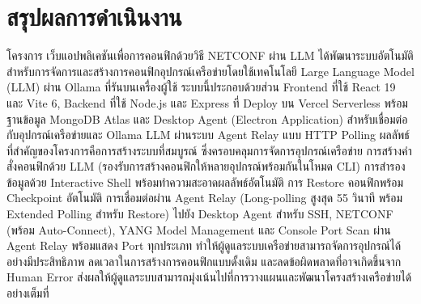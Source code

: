 ﻿%

\section{สรุปผลการดำเนินงาน}
\hspace*{1.3em}
โครงการ เว็บแอปพลิเคชันเพื่อการคอนฟิกด้วยวิธี NETCONF ผ่าน LLM ได้พัฒนาระบบอัตโนมัติสำหรับการจัดการและสร้างการคอนฟิกอุปกรณ์เครือข่ายโดยใช้เทคโนโลยี Large Language Model (LLM) ผ่าน Ollama ที่รันบนเครื่องผู้ใช้
ระบบนี้ประกอบด้วยส่วน Frontend ที่ใช้ React 19 และ Vite 6, Backend ที่ใช้ Node.js และ Express ที่ Deploy บน Vercel Serverless พร้อมฐานข้อมูล MongoDB Atlas และ Desktop Agent (Electron Application) สำหรับเชื่อมต่อกับอุปกรณ์เครือข่ายและ Ollama LLM ผ่านระบบ Agent Relay แบบ HTTP Polling
ผลลัพธ์ที่สำคัญของโครงการคือการสร้างระบบที่สมบูรณ์ ซึ่งครอบคลุมการจัดการอุปกรณ์เครือข่าย การสร้างคำสั่งคอนฟิกด้วย LLM (รองรับการสร้างคอนฟิกให้หลายอุปกรณ์พร้อมกันในโหมด CLI) การสำรองข้อมูลด้วย Interactive Shell พร้อมทำความสะอาดผลลัพธ์อัตโนมัติ การ Restore คอนฟิกพร้อม Checkpoint อัตโนมัติ การเชื่อมต่อผ่าน Agent Relay (Long-polling สูงสุด 55 วินาที พร้อม Extended Polling สำหรับ Restore) ไปยัง Desktop Agent สำหรับ SSH, NETCONF (พร้อม Auto-Connect), YANG Model Management และ Console Port Scan ผ่าน Agent Relay พร้อมแสดง Port ทุกประเภท
ทำให้ผู้ดูแลระบบเครือข่ายสามารถจัดการอุปกรณ์ได้อย่างมีประสิทธิภาพ ลดเวลาในการสร้างการคอนฟิกแบบดั้งเดิม และลดข้อผิดพลาดที่อาจเกิดขึ้นจาก Human Error
ส่งผลให้ผู้ดูแลระบบสามารถมุ่งเน้นไปที่การวางแผนและพัฒนาโครงสร้างเครือข่ายได้อย่างเต็มที่
